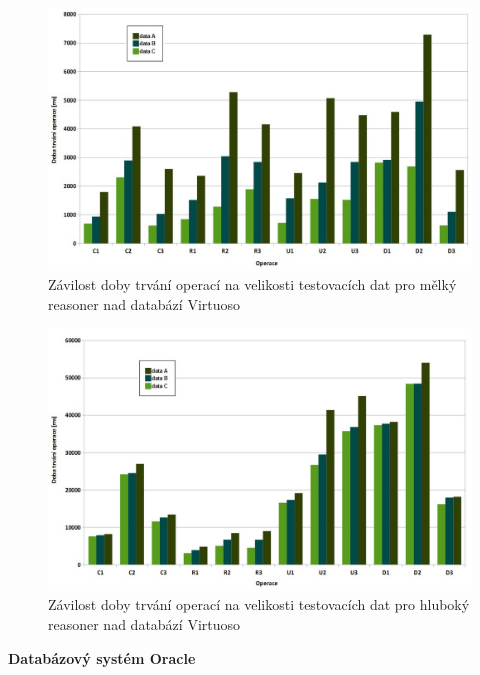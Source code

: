 \documentclass{projekt}
\begin{document}
\begin{figure}[htb!]
\begin{center}
\includegraphics[scale=0.45]{virtuosoShallow.jpg}
\caption{Závilost doby trvání operací na velikosti testovacích dat pro mělký reasoner nad databází Virtuoso}
\end{center}
\end{figure}


\begin{figure}[htb!]
\begin{center}
\includegraphics[scale=0.45]{virtuosoDeep.jpg}
\caption{Závilost doby trvání operací na velikosti testovacích dat pro hluboký reasoner nad databází Virtuoso}
\end{center}
\end{figure}

\newpage


{\bf Databázový systém Oracle}
\end{document}
